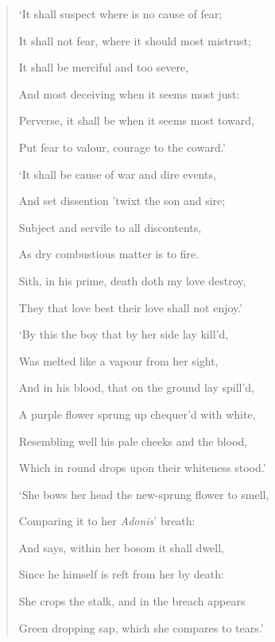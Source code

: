 \documentclass[a4paper, 11pt, oneside, polutonikogreek, english]{article}
\begin{document}
\begin{quotation}
`It shall suspect where is no cause of fear;

It shall not fear, where it should most mistrust;

It shall be merciful and too severe,

And most deceiving when it seems most just:

\hspace*{15mm}Perverse, it shall be when it seems most toward,

\hspace*{15mm}Put fear to valour, courage to the coward.'

\bigskip

`It shall be cause of war and dire events,

And set dissention 'twixt the son and sire;

Subject and servile to all discontents,

As dry combustious matter is to fire.

\hspace*{15mm}Sith, in his prime, death doth my love destroy,

\hspace*{15mm}They that love best their love shall not enjoy.'

\bigskip

`By this the boy that by her side lay kill'd,

Was melted like a vapour from her sight,

And in his blood, that on the ground lay spill'd,

A purple flower sprung up chequer'd with white,

\hspace*{15mm}Resembling well his pale cheeks and the blood,

\hspace*{15mm}Which in round drops upon their whiteness stood.'

\bigskip

`She bows her head the new-sprung flower to smell,

Comparing it to her \emph{Adonis}' breath:

And says, within her bosom it shall dwell,

Since he himself is reft from her by death:

\hspace*{15mm}She crops the stalk, and in the breach appears

\hspace*{15mm}Green dropping sap, which she compares to tears.'


\end{quotation}
\end{document}
